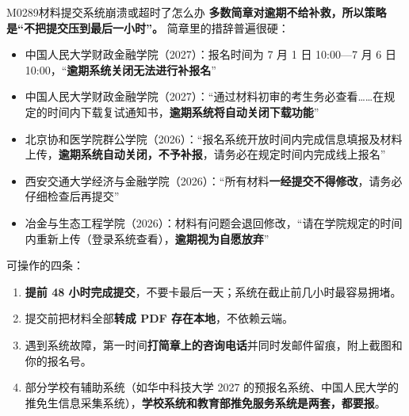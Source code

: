 \begin{qa}{M0289}{材料提交系统崩溃或超时了怎么办}
\textbf{多数简章对逾期不给补救，所以策略是“不把提交压到最后一小时”。} 简章里的措辞普遍很硬：

\begin{itemize}
  \item 中国人民大学财政金融学院（2027）：报名时间为 7 月 1 日 10:00—7 月 6 日 10:00，“\textbf{逾期系统关闭无法进行补报名}”
  \item 中国人民大学财政金融学院（2027）：“通过材料初审的考生务必查看……在规定的时间内下载复试通知书，\textbf{逾期系统将自动关闭下载功能}”
  \item 北京协和医学院群公学院（2026）：“报名系统开放时间内完成信息填报及材料上传，\textbf{逾期系统自动关闭，不予补报}，请务必在规定时间内完成线上报名”
  \item 西安交通大学经济与金融学院（2026）：“所有材料\textbf{一经提交不得修改}，请务必仔细检查后再提交”
  \item 冶金与生态工程学院（2026）：材料有问题会退回修改，“请在学院规定的时间内重新上传（登录系统查看），\textbf{逾期视为自愿放弃}”
\end{itemize}

可操作的四条：

\begin{enumerate}
  \item \textbf{提前 48 小时完成提交}，不要卡最后一天；系统在截止前几小时最容易拥堵。
  \item 提交前把材料全部\textbf{转成 PDF 存在本地}，不依赖云端。
  \item 遇到系统故障，第一时间\textbf{打简章上的咨询电话}并同时发邮件留痕，附上截图和你的报名号。
  \item 部分学校有辅助系统（如华中科技大学 2027 的预报名系统、中国人民大学的推免生信息采集系统），\textbf{学校系统和教育部推免服务系统是两套，都要报}。
\end{enumerate}
\end{qa}

